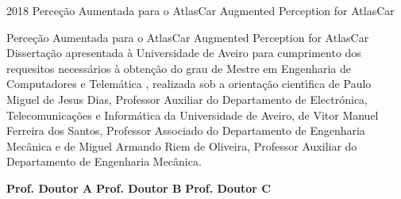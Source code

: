 \documentclass[11pt,twoside,a4paper]{report}
\def\ThesisYear{2018}
\begin{document}
%
%

\TitlePage
         {\ThesisYear}
        {Perce\c c\~ao Aumentada para o AtlasCar \newline Augmented Perception for AtlasCar}
\EndTitlePage
\titlepage\ \endtitlepage %

%
%

\TitlePage
  \HEADER{}{\ThesisYear}
        {Perce\c c\~ao Aumentada para o AtlasCar \newline Augmented Perception for AtlasCar}
  \vspace*{15mm}
  \TEXT{}
       {Disserta\c c\~ao apresentada \`a Universidade de Aveiro para cumprimento dos requesitos
        necess\'arios \`a obten\c c\~ao do grau de Mestre em Engenharia de Computadores e Telem\'atica , realizada sob a orienta\c c\~ao
        cient\'\i fica de Paulo Miguel de Jesus Dias, Professor Auxiliar do Departamento de Electr\'onica, Telecomunica\c c\~oes e Inform\'atica da Universidade de Aveiro, de Vitor Manuel Ferreira dos Santos, Professor Associado do Departamento de Engenharia Mec\^ anica e de Miguel Armando Riem de Oliveira, Professor Auxiliar do Departamento de Engenharia Mec\^ anica.}
\EndTitlePage
\titlepage\ \endtitlepage %

\TitlePage
  \vspace*{55mm}
       {}
       {\textbf{Prof. Doutor A}}
  \vspace*{5mm}
       {\textbf{Prof. Doutor B}}
  \vspace*{5mm}
  \TEXT{}
       {\textbf{Prof. Doutor C}}
\EndTitlePage
\titlepage\ \endtitlepage %
\end{document}
